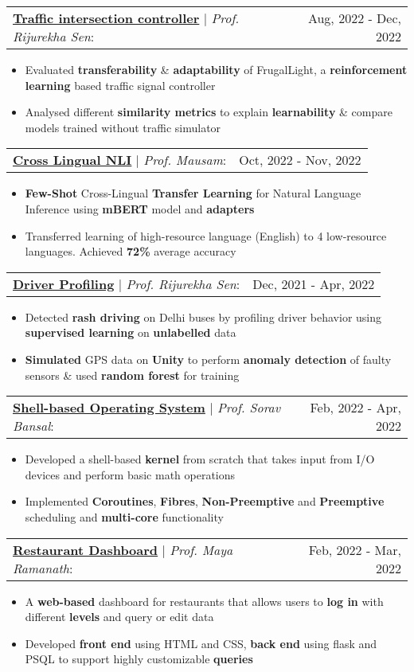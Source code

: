 \documentclass[letterpaper,11pt]{article}
\makeatletter
\newcommand{\resumeItem}[1]{
  \item\small{
    {#1 \vspace{-2pt}}
  }
}
\newcommand{\headingStart}{
  \begin{tabular*}{0.97\textwidth}[t]{l@{\extracolsep{\fill}}r}
}
\newcommand{\projectHeading}[3]{
    \item
    \headingStart
      \underline{\textbf{#1}} $|$ \textit{#2}: & #3 \\
    \end{tabular*}\vspace{-7pt}
}
\newcommand{\itemListStart}[1]
  {\begin{itemize}[leftmargin=#1in, rightmargin=0in]}
\newcommand{\itemListEnd}{\end{itemize}\vspace{-5pt}}
\makeatother
\begin{document}
      \projectHeading
        {Traffic intersection controller}
        {Prof. Rijurekha Sen}
        {Aug, 2022 - Dec, 2022}
        \itemListStart{0.2}
          \resumeItem{Evaluated \textbf{transferability} \& \textbf{adaptability} of FrugalLight, a \textbf{reinforcement learning} based traffic signal controller}
          \resumeItem{Analysed different \textbf{similarity metrics} to explain \textbf{learnability} \& compare models trained without traffic simulator}
        \itemListEnd
      
      \projectHeading
        {\href{https://github.com/its-sachin/Multilingual-NLI}{Cross Lingual NLI}}
        {Prof. Mausam}
        {Oct, 2022 - Nov, 2022}
        \itemListStart{0.2}
          \resumeItem{\textbf{Few-Shot} Cross-Lingual \textbf{Transfer Learning} for Natural Language Inference using \textbf{mBERT} model and \textbf{adapters}}
          \resumeItem{Transferred learning of high-resource language (English) to 4 low-resource languages. Achieved \textbf{72\%} average accuracy}
        \itemListEnd


      \projectHeading
        {Driver Profiling}
        {Prof. Rijurekha Sen}
        {Dec, 2021 - Apr, 2022}
        \itemListStart{0.2}
          \resumeItem{Detected \textbf{rash driving} on Delhi buses by profiling driver behavior using \textbf{supervised learning} on \textbf{unlabelled} data}
          \resumeItem{\textbf{Simulated} GPS data on \textbf{Unity} to perform \textbf{anomaly detection} of faulty sensors \& used \textbf{random forest} for training}
        \itemListEnd


      \projectHeading
        {Shell-based Operating System}
        {Prof. Sorav Bansal}
        {Feb, 2022 - Apr, 2022}
        \itemListStart{0.2}
          \resumeItem{Developed a shell-based \textbf{kernel} from scratch that takes input from I/O devices and perform basic math operations}
          \resumeItem{Implemented \textbf{Coroutines}, \textbf{Fibres}, \textbf{Non-Preemptive} and \textbf{Preemptive} scheduling and \textbf{multi-core} functionality}
        \itemListEnd

      \projectHeading
        {\href{https://github.com/heisenberg600/COL362_Project}{Restaurant Dashboard}}
        {Prof. Maya Ramanath}
        {Feb, 2022 - Mar, 2022}
        \itemListStart{0.2}
          \resumeItem{A \textbf{web-based} dashboard for restaurants that allows users to \textbf{log in} with different \textbf{levels} and query or edit data}
          \resumeItem{Developed \textbf{front end} using HTML and CSS, \textbf{back end} using flask and PSQL to support highly customizable \textbf{queries}}
        \itemListEnd
\end{document}
